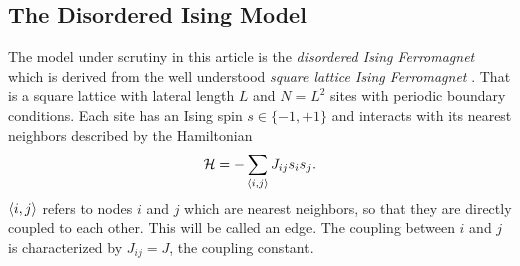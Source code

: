 \subsection{The Disordered Ising Model}
The model under scrutiny in this article is the \emph{disordered Ising Ferromagnet}
which is derived from the well understood \emph{square lattice Ising Ferromagnet} \cite{Onsager1944}.
That is a square lattice with lateral length \(L\) and \(N=L^2\)
sites with periodic boundary conditions.
Each site has an Ising spin \(s \in \{-1,+1\}\) and interacts with its
nearest neighbors described by the Hamiltonian
\begin{equation}
    \mathcal{H} = - \sum_{\left< i,j \right>}J_{ij}s_{i}s_{j}.
    \label{eq:hamiltonian}
\end{equation}
\(\left< i,j \right>\) refers to nodes \(i\) and \(j\) which are nearest
neighbors, so that they are directly coupled to each other.
This will be called an edge.
The coupling between \(i\) and \(j\) is characterized by \(J_{ij} = J\),
the coupling constant.

